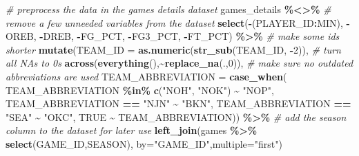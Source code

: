 \documentclass[
  12pt,
  a4paper,
]{article}
\newenvironment{Shaded}{\begin{snugshade}}{\end{snugshade}}
\newcommand{\AttributeTok}[1]{\textcolor[rgb]{0.13,0.29,0.53}{#1}}
\newcommand{\CommentTok}[1]{\textcolor[rgb]{0.56,0.35,0.01}{\textit{#1}}}
\newcommand{\ConstantTok}[1]{\textcolor[rgb]{0.56,0.35,0.01}{#1}}
\newcommand{\DecValTok}[1]{\textcolor[rgb]{0.00,0.00,0.81}{#1}}
\newcommand{\FunctionTok}[1]{\textcolor[rgb]{0.13,0.29,0.53}{\textbf{#1}}}
\newcommand{\NormalTok}[1]{#1}
\newcommand{\SpecialCharTok}[1]{\textcolor[rgb]{0.81,0.36,0.00}{\textbf{#1}}}
\newcommand{\StringTok}[1]{\textcolor[rgb]{0.31,0.60,0.02}{#1}}
\begin{document}
\begin{Shaded}
\begin{Highlighting}[]
\CommentTok{\# preprocess the data in the games details dataset}
\NormalTok{games\_details }\SpecialCharTok{\%\textless{}\textgreater{}\%}
  \CommentTok{\# remove a few unneeded variables from the dataset}
  \FunctionTok{select}\NormalTok{(}\SpecialCharTok{{-}}\NormalTok{(PLAYER\_ID}\SpecialCharTok{:}\NormalTok{MIN), }\SpecialCharTok{{-}}\NormalTok{OREB, }\SpecialCharTok{{-}}\NormalTok{DREB,}
         \SpecialCharTok{{-}}\NormalTok{FG\_PCT, }\SpecialCharTok{{-}}\NormalTok{FG3\_PCT, }\SpecialCharTok{{-}}\NormalTok{FT\_PCT) }\SpecialCharTok{\%\textgreater{}\%}
  \CommentTok{\# make some ids shorter}
  \FunctionTok{mutate}\NormalTok{(}\AttributeTok{TEAM\_ID =} \FunctionTok{as.numeric}\NormalTok{(}\FunctionTok{str\_sub}\NormalTok{(TEAM\_ID, }\SpecialCharTok{{-}}\DecValTok{2}\NormalTok{)),}
         \CommentTok{\# turn all NAs to 0s}
         \FunctionTok{across}\NormalTok{(}\FunctionTok{everything}\NormalTok{(),}\SpecialCharTok{\textasciitilde{}}\FunctionTok{replace\_na}\NormalTok{(.,}\DecValTok{0}\NormalTok{)),}
         \CommentTok{\# make sure no outdated abbreviations are used}
         \AttributeTok{TEAM\_ABBREVIATION =} \FunctionTok{case\_when}\NormalTok{(}
\NormalTok{         TEAM\_ABBREVIATION }\SpecialCharTok{\%in\%} \FunctionTok{c}\NormalTok{(}\StringTok{"NOH"}\NormalTok{, }\StringTok{"NOK"}\NormalTok{) }\SpecialCharTok{\textasciitilde{}} \StringTok{"NOP"}\NormalTok{,}
\NormalTok{         TEAM\_ABBREVIATION }\SpecialCharTok{==} \StringTok{"NJN"} \SpecialCharTok{\textasciitilde{}} \StringTok{"BKN"}\NormalTok{,}
\NormalTok{         TEAM\_ABBREVIATION }\SpecialCharTok{==} \StringTok{"SEA"} \SpecialCharTok{\textasciitilde{}} \StringTok{"OKC"}\NormalTok{,}
         \ConstantTok{TRUE} \SpecialCharTok{\textasciitilde{}}\NormalTok{ TEAM\_ABBREVIATION)) }\SpecialCharTok{\%\textgreater{}\%}
  \CommentTok{\# add the season column to the dataset for later use}
  \FunctionTok{left\_join}\NormalTok{(games }\SpecialCharTok{\%\textgreater{}\%} \FunctionTok{select}\NormalTok{(GAME\_ID,SEASON),}
            \AttributeTok{by=}\StringTok{"GAME\_ID"}\NormalTok{,}\AttributeTok{multiple=}\StringTok{"first"}\NormalTok{)}


\end{Highlighting}
\end{Shaded}
\end{document}
